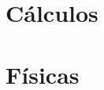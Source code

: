 \documentclass[a4paper]{report}
\begin{document}
\chapter{Cálculos}





\chapter{Físicas}





\end{document}
